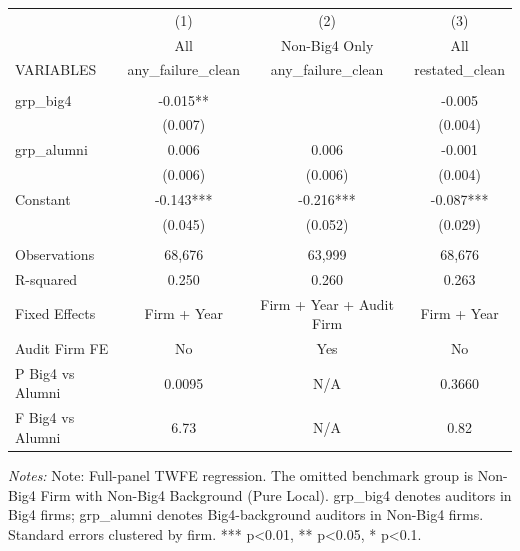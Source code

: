 \documentclass[10pt]{article}
\begin{document}
\begin{minipage}{20cm}\fontsize{10}{12}\selectfont\setlength{\tabcolsep}{4pt}\renewcommand{\arraystretch}{1.12}


\centering
{}
\begin{threeparttable}
\begin{tabular}{p{}ccc}
\toprule
 & (1) & (2) & (3) \\
 & All & Non-Big4 Only & All \\
VARIABLES & any\_failure\_clean & any\_failure\_clean & restated\_clean \\
\midrule
 &  &  &  \\
grp\_big4 & -0.015** &  & -0.005 \\
 & (0.007) &  & (0.004) \\
grp\_alumni & 0.006 & 0.006 & -0.001 \\
 & (0.006) & (0.006) & (0.004) \\
Constant & -0.143*** & -0.216*** & -0.087*** \\
 & (0.045) & (0.052) & (0.029) \\
 &  &  &  \\
Observations & 68,676 & 63,999 & 68,676 \\
R-squared & 0.250 & 0.260 & 0.263 \\
Fixed Effects & Firm + Year & Firm + Year + Audit Firm & Firm + Year \\
Audit Firm FE & No & Yes & No \\
P Big4 vs Alumni & 0.0095 & N/A & 0.3660 \\
F Big4 vs Alumni & 6.73 & N/A & 0.82 \\
\bottomrule
\end{tabular}
\begin{tablenotes}\fontsize{9}{11}\selectfont
\item \raggedright \fontsize{9}{11}\selectfont \textit{Notes:} Note: Full-panel TWFE regression. The omitted benchmark group is Non-Big4 Firm with Non-Big4 Background (Pure Local). grp\_big4 denotes auditors in Big4 firms; grp\_alumni denotes Big4-background auditors in Non-Big4 firms. Standard errors clustered by firm. *** p<0.01, ** p<0.05, * p<0.1.
\end{tablenotes}
\end{threeparttable}

\end{minipage}
\end{document}
